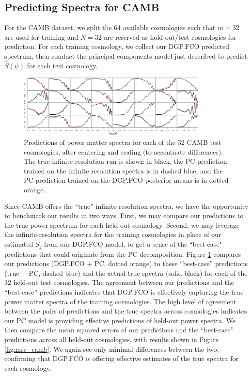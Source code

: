 \documentclass[11pt]{article}
\begin{document}
\subsection{Predicting Spectra for CAMB}
\label{subsec:camb_pred}

For the CAMB dataset, we split the 64 available cosmologies such that $m=32$
are used for training and $N=32$ are reserved as hold-out/test cosmologies for prediction. 
For each training cosmology, we collect our DGP.FCO predicted spectrum, then conduct the principal
components model just described to predict $\hat{S}(\psi)$ for each test cosmology.  

\begin{figure}
    \centering
    \includegraphics[width=0.85\textwidth]{pred_diffs_CAMB.jpeg}
    \caption{Predictions of power matter spectra for each of the 32 CAMB test cosmologies,
             after centering and scaling (to accentuate differences). 
             The true infinite resolution run is shown in black, the PC prediction 
             trained on the infinite resolution spectra is in dashed blue, and the PC prediction trained
             on the DGP.FCO posterior means is in dotted orange.}
    \label{fig:pca_preds_v_camb}
\end{figure}

Since CAMB offers the ``true'' infinite-resolution spectra, we have the opportunity to benchmark our
results in two ways.  First, we may compare our predictions to the true power spectrum for each held-out
cosmology.  Second, we may leverage the infinite-resolution spectra for the training cosmologies in
place of our estimated $\hat{S}_j$ from our DGP.FCO model, to get a sense of the ``best-case" predictions 
that could originate from the PC decomposition.  
Figure \ref{fig:pca_preds_v_camb} compares our predictions (DGP.FCO + PC, dotted orange)
to these ``best-case'' predictions (true + PC, dashed blue) and the actual true spectra (solid black)
for each of the 32 held-out test cosmologies.  
The agreement between our predictions and the ``best-case'' predictions indicates that DGP.FCO is effectively
capturing the true power matter spectra of the training cosmologies.
The high level of agreement between the pairs of predictions and the true spectra across cosmologies
indicates our PC model is providing effective predictions of held-out power spectra.
We then compare the mean squared errors of our predictions and the ``best-case'' 
predictions across all held-out cosmologies, with results shown in Figure \ref{fig:mse_camb}.  We again
see only minimal differences between the two, confirming that DGP.FCO is offering effective
estimates of the true spectra for each cosmology.
\end{document}
